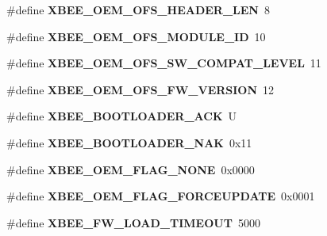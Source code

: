 \begin{DoxyCompactItemize}
\#define {\bfseries X\+B\+E\+E\+\_\+\+O\+E\+M\+\_\+\+O\+F\+S\+\_\+\+H\+E\+A\+D\+E\+R\+\_\+\+L\+EN}~8
\item 
\mbox{\label{group__xbee__firmware_ga9819ebdc24e69594a3f511caa46a7ea9}} 
\#define {\bfseries X\+B\+E\+E\+\_\+\+O\+E\+M\+\_\+\+O\+F\+S\+\_\+\+M\+O\+D\+U\+L\+E\+\_\+\+ID}~10
\item 
\mbox{\label{group__xbee__firmware_ga36a4d3918b8dce95c49f64a66a60c940}} 
\#define {\bfseries X\+B\+E\+E\+\_\+\+O\+E\+M\+\_\+\+O\+F\+S\+\_\+\+S\+W\+\_\+\+C\+O\+M\+P\+A\+T\+\_\+\+L\+E\+V\+EL}~11
\item 
\mbox{\label{group__xbee__firmware_ga08c3c592ffffa1278d96c33fda285b87}} 
\#define {\bfseries X\+B\+E\+E\+\_\+\+O\+E\+M\+\_\+\+O\+F\+S\+\_\+\+F\+W\+\_\+\+V\+E\+R\+S\+I\+ON}~12
\item 
\mbox{\label{group__xbee__firmware_gab7cbb4f6b1f3bb08d85a092921689c57}} 
\#define {\bfseries X\+B\+E\+E\+\_\+\+B\+O\+O\+T\+L\+O\+A\+D\+E\+R\+\_\+\+A\+CK}~\textquotesingle{}U\textquotesingle{}
\item 
\mbox{\label{group__xbee__firmware_ga4a6c559672de2516d8d86335f1753715}} 
\#define {\bfseries X\+B\+E\+E\+\_\+\+B\+O\+O\+T\+L\+O\+A\+D\+E\+R\+\_\+\+N\+AK}~0x11
\item 
\mbox{\label{group__xbee__firmware_ga01933f6abed1e3799566a284d24af8b3}} 
\#define {\bfseries X\+B\+E\+E\+\_\+\+O\+E\+M\+\_\+\+F\+L\+A\+G\+\_\+\+N\+O\+NE}~0x0000
\item 
\mbox{\label{group__xbee__firmware_ga28fca9c70673cb50a5103c8685e1af36}} 
\#define {\bfseries X\+B\+E\+E\+\_\+\+O\+E\+M\+\_\+\+F\+L\+A\+G\+\_\+\+F\+O\+R\+C\+E\+U\+P\+D\+A\+TE}~0x0001
\item 
\mbox{\label{group__xbee__firmware_gab8438d198ddcd31a879433fe582a7b7c}} 
\#define {\bfseries X\+B\+E\+E\+\_\+\+F\+W\+\_\+\+L\+O\+A\+D\+\_\+\+T\+I\+M\+E\+O\+UT}~5000
\item 
\mbox{\label{group__xbee__firmware_gae475cea6680670df9180ef1ce2603fb6}} 

\end{DoxyCompactItemize}
